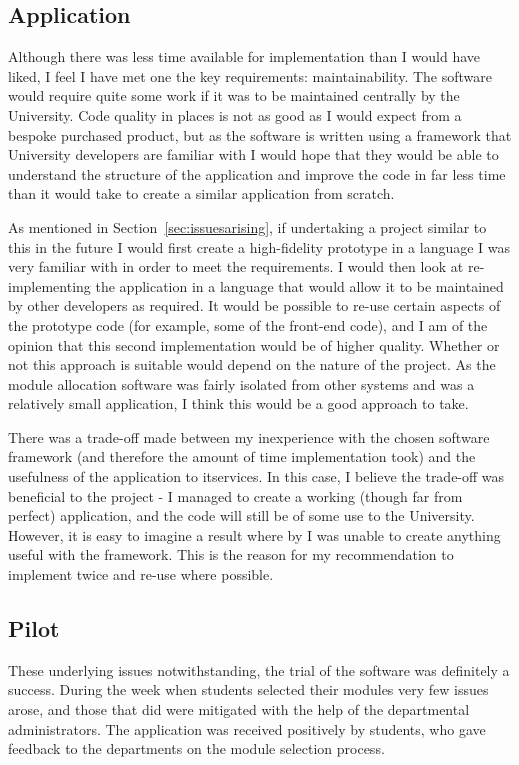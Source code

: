 \subsection{Application}

Although there was less time available for implementation than I would have
liked, I feel I have met one the key requirements: maintainability. The
software would require quite some work if it was to be maintained centrally by
the University. Code quality in places is not as good as I would expect from a
bespoke purchased product, but as the software is written using a framework
that University developers are familiar with I would hope that they would be
able to understand the structure of the application and improve the code in
far less time than it would take to create a similar application from scratch.

As mentioned in Section~\ref{sec:issuesarising}, if undertaking a project
similar to this in the future I would first create a high-fidelity prototype
in a language I was very familiar with in order to meet the requirements. I
would then look at re-implementing the application in a language that would
allow it to be maintained by other developers as required. It would be
possible to re-use certain aspects of the prototype code (for example, some of
the front-end code), and I am of the opinion that this second implementation
would be of higher quality. Whether or not this approach is suitable would
depend on the nature of the project. As the module allocation software was
fairly isolated from other systems and was a relatively small application, I
think this would be a good approach to take.

There was a trade-off made between my inexperience with the chosen software
framework (and therefore the amount of time implementation took) and the
usefulness of the application to \gls{itservices}. In this case, I believe the
trade-off was beneficial to the project - I managed to create a working
(though far from perfect) application, and the code will still be of some use
to the University. However, it is easy to imagine a result where by I was
unable to create anything useful with the framework. This is the reason for my
recommendation to implement twice and re-use where possible.

\subsection{Pilot}

These underlying issues notwithstanding, the trial of the software was
definitely a success. During the week when students selected their modules
very few issues arose, and those that did were mitigated with the help of the
departmental administrators. The application was received positively by
students, who gave feedback to the departments on the module selection
process.

